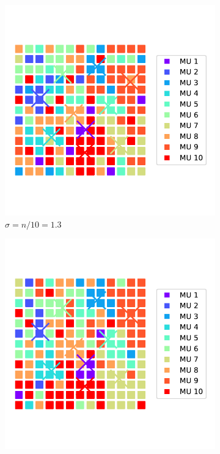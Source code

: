 \begin{figure}%
  \centering%
  \begin{subfigure}[t]{0.48\textwidth}%
    \centering%
    \includegraphics[width=\textwidth]{images/motor_unit_assignment/MU_fibre_distribution_13x13_10_2d_fiber_distribution.pdf}%
    \caption{$\sigma = n/10 = 1.3$}%
    \label{fig:MU_fibre_distribution_13x13_10_2d_fiber_distribution}%
  \end{subfigure}
  \begin{subfigure}[t]{0.48\textwidth}%
    \centering%
    \includegraphics[width=\textwidth]{images/motor_unit_assignment/MU_fibre_distribution_13x13_10_2d_fiber_distribution_sigma.pdf}%

\end{subfigure}
\end{figure}
